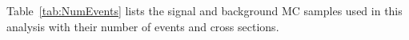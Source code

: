 Table~\ref{tab:NumEvents} 
lists the signal and background MC samples used in this analysis with their number of events and cross sections.


